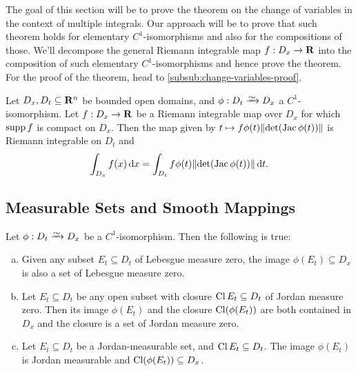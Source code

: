 The goal of this section will be to prove the theorem on the change of variables
in the context of multiple integrals. Our approach will be to prove that such
theorem holds for elementary \(C^1\)-isomorphisms and also for the compositions
of those. We'll decompose the general Riemann integrable map \(f: D_x \to \mathbf{R}\)
into the composition of such elementary \(C^1\)-isomorphisms and hence prove the
theorem. For the proof of the theorem, head to
\cref{subsub:change-variables-proof}.

\begin{theorem}
    \label{thm:change-variables}
    Let \(D_x, D_t \subseteq \mathbf{R}^n\) be bounded open domains, and \(\phi: D_t \isoto
    D_x\) a \(C^1\)-isomorphism. Let \(f: D_x \to \mathbf{R}\) be a Riemann integrable map
    over \(D_x\) for which \(\operatorname{supp} f\) is compact on \(D_x\). Then the map given by
    \(t \mapsto f \phi(t) \lVert\det(\operatorname{Jac} \phi(t))\rVert\) is Riemann integrable on
    \(D_t\) and
    \[
        \int_{D_x} f(x)\, \mathrm{d} x
        = \int_{D_t} f \phi(t) \lVert\det(\operatorname{Jac} \phi(t))\rVert\, \mathrm{d} t.
    \]
\end{theorem}

\subsection{Measurable Sets and Smooth Mappings}

\begin{lemma}
    \label{lem:C1-isomorphisms-preserve-measure-properties}
    Let \(\phi: D_t \isoto D_x\) be a \(C^1\)-isomorphism. Then the following is
    true:
    \begin{enumerate}[(a)]\setlength\itemsep{0em}
        \item Given any subset \(E_t \subseteq D_t\) of Lebesgue measure zero, the image
              \(\phi(E_t) \subseteq D_x\) is also a set of Lebesgue measure zero.

        \item Let \(E_t \subseteq D_t\) be any open subset with closure \(\operatorname{Cl} E_t
              \subseteq D_t\) of Jordan measure zero. Then its image \(\phi(E_t)\) and the
              closure \(\operatorname{Cl}(\phi(E_t))\) are both contained in \(D_x\) and the closure
              is a set of Jordan measure zero.

        \item Let \(E_t \subseteq D_t\) be a Jordan-measurable set, and \(\operatorname{Cl} E_t
              \subseteq D_t\). The image \(\phi(E_t)\) is Jordan measurable and
              \(\operatorname{Cl}(\phi(E_t)) \subseteq D_x\).
    \end{enumerate}
\end{lemma}

